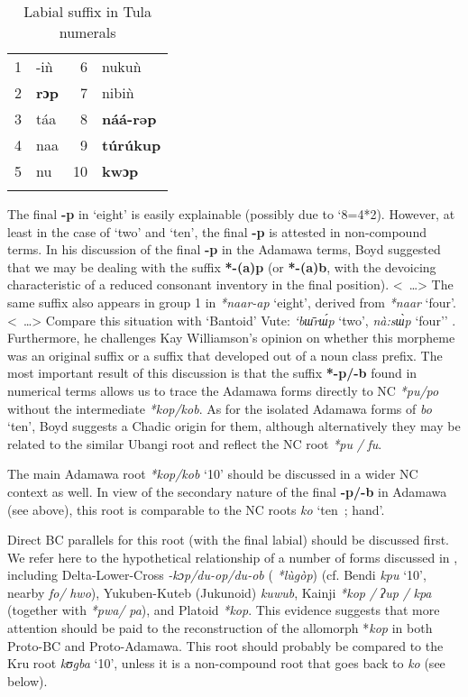 \begin{table}
\caption{\label{tab:4:39}Labial suffix in Tula numerals}


\begin{tabularx}{.8\textwidth}{rXrX}
\lsptoprule

1 & -i{\`{n}} & 6 & nuku{\`{n}}\\
2 & \textbf{rɔp} & 7 & nibi{\`{n}}\\
3 & táa & 8 & \textbf{náá-rəp}\\
4 & naa & 9 &  \textbf{túrúkup}\\
5 & nu & 10 & \textbf{kwɔp}\\
\lspbottomrule
\end{tabularx}
\end{table}
The final \textbf{-p} in ‘eight’ is easily explainable (possibly due to ‘8=4*2). However, at least in the case of ‘two’ and ‘ten’, the final \textbf{-p} is attested in non-compound terms. In his discussion of the final \textbf{-p} in the Adamawa terms, Boyd suggested that we may be dealing with the suffix \textbf{*-(a}\textbf{)p} (or \textbf{*-(a}\textbf{)b}, with the devoicing characteristic of a reduced consonant inventory in the final position). <~…> The same suffix also appears in group 1 in \textit{*naar-ap} ‘eight’, derived from \textit{*naar} ‘four’. <~…> Compare this situation with ‘Bantoid’ Vute: \textit{‘b{\={ɯ}}r{\'{ɯ}}p} ‘two’, \textit{nà:s{\`{ɯ}}p} ‘four’’ \citep[156]{Boyd1989}. Furthermore, he challenges Kay Williamson’s opinion on whether this morpheme was an original suffix or a suffix that developed out of a noun class prefix. The most important result of this discussion is that the suffix \textbf{*-p}\textbf{/-b} found in numerical terms allows us to trace the Adamawa forms directly to NC \textit{*pu/po} without the intermediate \textit{*kop/kob}. As for the isolated Adamawa forms of \textit{bo} ‘ten’, Boyd suggests a Chadic origin for them, although alternatively they may be related to the similar Ubangi root and reflect the NC root \textit{*pu} \textit{/} \textit{fu}.

The main Adamawa root \textit{*kop/kob} ‘10’ should be discussed in a wider NC context as well. In view of the secondary nature of the final \textbf{-p/-b} in Adamawa (see above), this root is comparable to the NC roots \textit{ko} ‘ten~; hand’.

Direct BC parallels for this root (with the final labial) should be discussed first. We refer here to the hypothetical relationship of a number of forms discussed in , including Delta-Lower-Cross \textit{-kɔp/du-op/du-ob} (\citealt{Dimmendaal1978} \textit{*l{\`{u}}gòp}) (cf. Bendi \textit{kpu} ‘10’, nearby \textit{fo/} \textit{hwo}), Yukuben-Kuteb (Jukunoid) \textit{kuwub}, Kainji \textit{*kop} \textit{/} \textit{ʔup} \textit{/} \textit{kpa} (together with \textit{*pwa/} \textit{pa}), and Platoid \textit{*kop}. This evidence suggests that more attention should be paid to the reconstruction of the allomorph *\textit{kop} in both Proto-BC and Proto-Adamawa. This root should probably be compared to the Kru root \textit{kʊgba} ‘10’, unless it is a non-compound root that goes back to \textit{ko} (see below).

